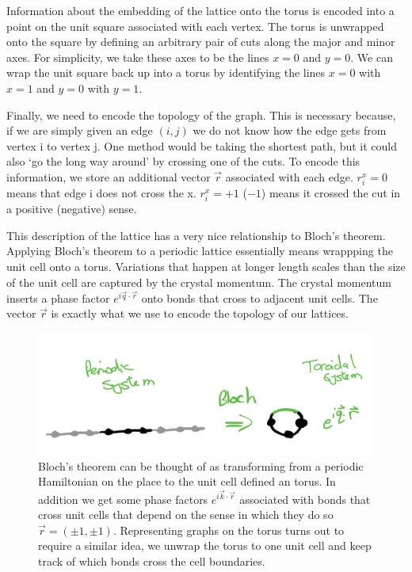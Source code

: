 Information about the embedding of the lattice onto the torus is encoded into a point on the unit square associated with each vertex. The torus is unwrapped onto the square by defining an arbitrary pair of cuts along the major and minor axes. For simplicity, we take these axes to be the lines \(x = 0\) and \(y = 0\). We can wrap the unit square back up into a torus by identifying the lines \(x = 0\) with \(x = 1\) and \(y = 0\) with \(y = 1\).

Finally, we need to encode the topology of the graph. This is necessary because, if we are simply given an edge \((i, j)\) we do not know how the edge gets from vertex i to vertex j. One method would be taking the shortest path, but it could also `go the long way around' by crossing one of the cuts. To encode this information, we store an additional vector \(\vec{r}\) associated with each edge. \(r_i^x = 0\) means that edge i does not cross the x. \(r_i^x = +1\) (\(-1\)) means it crossed the cut in a positive (negative) sense.

This description of the lattice has a very nice relationship to Bloch's theorem. Applying Bloch's theorem to a periodic lattice essentially means wrappping the unit cell onto a torus. Variations that happen at longer length scales than the size of the unit cell are captured by the crystal momentum. The crystal momentum inserts a phase factor \(e^{i \vec{q}\cdot\vec{r}}\) onto bonds that cross to adjacent unit cells. The vector \(\vec{r}\) is exactly what we use to encode the topology of our lattices.

\hypertarget{fig:bloch}{%
\begin{figure}
\centering
\includegraphics[width=1\textwidth,height=\textheight]{figure_code/amk_chapter/methods/bloch.png}
\caption[{Bloch's Theorem and the Torus}]{Bloch's theorem can be thought of as transforming from a periodic Hamiltonian on the place to the unit cell defined an torus. In addition we get some phase factors \(e^{i\vec{k}\cdot\vec{r}}\) associated with bonds that cross unit cells that depend on the sense in which they do so \(\vec{r} = (\pm1, \pm1)\). Representing graphs on the torus turns out to require a similar idea, we unwrap the torus to one unit cell and keep track of which bonds cross the cell boundaries.}
\label{fig:bloch}
\end{figure}
}

